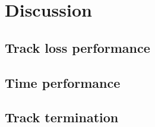 \section{Discussion}
\label{sec:discussion}
\subsection{Track loss performance}

\subsection{Time performance}




\subsection{Track termination}


